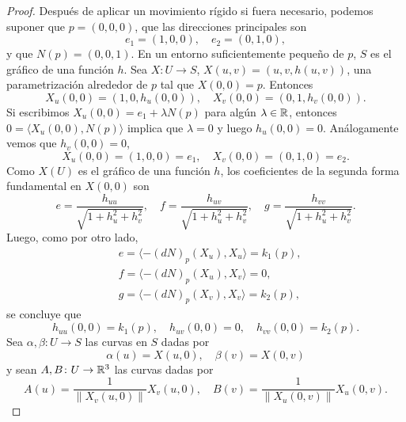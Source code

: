 \begin{proof}
	Después de aplicar un movimiento rígido si fuera necesario, podemos 
	suponer que $p=(0,0,0)$, que las direcciones principales son
	\[
		e_1=(1,0,0),\quad
		e_2=(0,1,0),
	\]
	y que $N(p)=(0,0,1)$. 
	En un entorno suficientemente pequeño de $p$, $S$ es el gráfico de una función
	$h$. Sea $X\colon U\to S$, $X(u,v)=(u,v,h(u,v))$, una
	parametrización alrededor de $p$ tal que $X(0,0)=p$. Entonces
	\[
		X_u(0,0)=(1,0,h_u(0,0)),\quad
		X_v(0,0)=(0,1,h_v(0,0)).
	\]
	Si escribimos $X_u(0,0)=e_1+\lambda N(p)$ para algún $\lambda\in\mathbb{R}$,
	entonces $0=\langle X_u(0,0),N(p)\rangle$ implica que $\lambda=0$ y luego
	$h_u(0,0)=0$. Análogamente vemos que $h_v(0,0)=0$,
	\[
		X_u(0,0)=(1,0,0)=e_1,\quad
		X_v(0,0)=(0,1,0)=e_2.
	\]
	Como $X(U)$ es el gráfico de una función $h$, 
	los coeficientes de la segunda forma fundamental en $X(0,0)$ son
	\[
		e=\frac{h_{uu}}{\sqrt{1+h_u^2+h_v^2}},\quad
		f=\frac{h_{uv}}{\sqrt{1+h_u^2+h_v^2}},\quad
		g=\frac{h_{vv}}{\sqrt{1+h_u^2+h_v^2}}.
	\]
	Luego, como por otro lado, 
	\begin{align*}
		&e=\langle -(dN)_p(X_u),X_u\rangle=k_1(p),\\
		&f=\langle -(dN)_p(X_u),X_v\rangle=0,\\
		&g=\langle -(dN)_p(X_v),X_v\rangle=k_2(p),
	\end{align*}
	se concluye que 
	\[
		h_{uu}(0,0)=k_1(p),\quad
		h_{uv}(0,0)=0,\quad
		h_{vv}(0,0)=k_2(p).
	\]
	Sea $\alpha,\beta\colon U\to S$ las curvas en $S$ dadas por
	\[
		\alpha(u)=X(u,0),\quad
		\beta(v)=X(0,v)
	\]
	y sean $A,B\colon U\to\mathbb{R}^3$ las curvas dadas por
	\[
		A(u)=\frac{1}{\|X_v(u,0)\|}X_v(u,0),\quad
		B(v)=\frac{1}{\|X_u(0,v)\|}X_u(0,v).
	\]


\end{proof}
